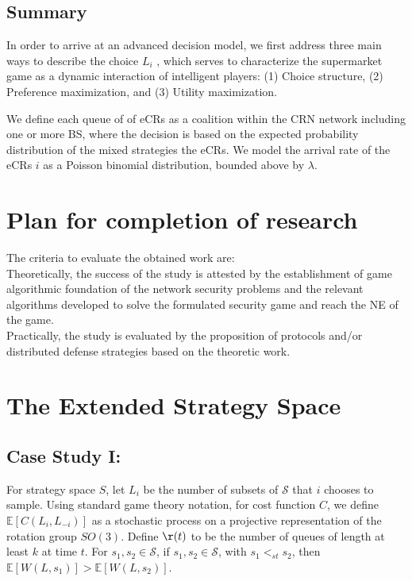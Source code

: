 \documentclass[10pt]{article}
\newcommand{\mcS}{\mathcal{S}}
\theoremstyle{definition}
\begin{document}
\subsection{Summary}
In order to arrive at an advanced decision model, we first
address three main ways to describe the choice $L_i$ , which serves to characterize the supermarket game
as a dynamic interaction of intelligent players: (1) Choice structure, (2) Preference maximization,
and (3) Utility maximization.

We define each queue of of eCRs as a coalition
within the CRN network including one or more BS, where the decision is based on the expected
probability distribution of the mixed strategies the eCRs. We model the arrival
rate of the eCRs $i$
as a Poisson binomial distribution, bounded above by $\lambda$.

\section{Plan for completion of research}

The criteria to evaluate the obtained work are:
\\ Theoretically, the success of the study is attested by the establishment of game algorithmic
foundation of the network security problems and the relevant algorithms developed to solve the
formulated security game and reach the NE of the game.
\\ Practically, the study is evaluated by the proposition of protocols and/or distributed defense
strategies based on the theoretic work. 

\section{The Extended Strategy Space}
\subsection{Case Study I:}
For strategy space $S$,
let $L_i$ be the number of subsets of $\mcS$ that $i$ chooses to sample.
Using standard game theory notation, for cost function $C$, we define $\mathbb{E}[C(L_i, L_{-i})]$ as a stochastic process on a projective representation of the rotation
group $SO(3)$. 
Define $\r(t)$ to be the number of queues of length at least $k$ at time $t$.
For $s_1, s_2 \in \mcS$, if $s_1,s_2\in\mcS$, with $s_1<_{st} s_2$, then
$\mathbb{E}[W(L,s_1)] > \mathbb{E}[W(L,s_2)]$.
\end{document}
